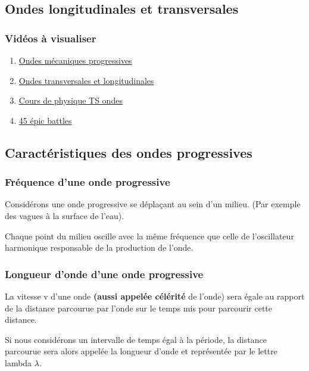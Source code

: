 \begin{multicols}{2}
\subsection{Ondes longitudinales et transversales }

\subsubsection{Vidéos à visualiser}

\begin{enumerate}
 \item \href{https://youtu.be/6eTtMmU9sqM}{Ondes mécaniques progressives}
 \item \href{https://youtu.be/X8wx9n0mgaM}{Ondes transversales et longitudinales}
 \item \href{https://youtu.be/mq9qbbSGgos}{Cours de physique TS ondes}
\item \href{https://youtu.be/cNXP3XnS60s}{45 épic battles}
\end{enumerate}

\subsection{Caractéristiques des ondes progressives}

\subsubsection{Fréquence d'une onde progressive}

Considérons une onde progressive se déplaçant au sein d'un milieu. (Par
exemple des vagues à la surface de l'eau).

Chaque point du milieu oscille avec la même fréquence que celle de
l'oscillateur harmonique responsable de la production de l'onde.

\subsubsection{Longueur d'onde d'une onde progressive }

La vitesse v d'une onde \textbf{(aussi appelée célérité} de l'onde) sera
égale au rapport de la distance parcourue par l'onde sur le temps mis
pour parcourir cette distance.

Si nous considérons un intervalle de temps égal à la période, la
distance parcourue sera alors appelée la longueur d'onde et représentée
par le lettre lambda $\lambda$.


\end{multicols}
